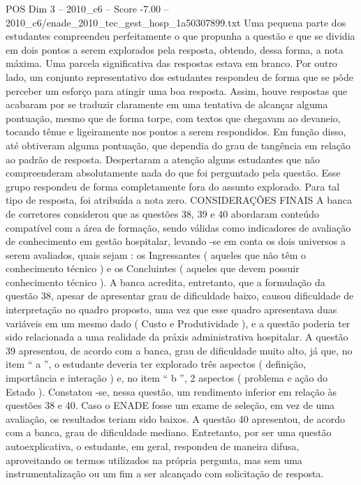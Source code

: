 \begin{textsample}{POS Dim 3 – 2010\_c6 – Score -7.00 – 2010\_c6/enade\_2010\_tec\_gest\_hosp\_1a50307899.txt}
Uma pequena parte dos estudantes compreendeu perfeitamente o que propunha a questão e que se dividia em dois pontos a serem explorados pela resposta, obtendo, dessa forma, a nota máxima.
Uma parcela significativa das respostas estava em branco.
Por outro lado, um conjunto representativo dos estudantes respondeu de forma que se pôde perceber um esforço para atingir uma boa resposta.
Assim, houve respostas que acabaram por se traduzir claramente em uma tentativa de alcançar alguma pontuação, mesmo que de forma torpe, com textos que chegavam ao devaneio, tocando tênue e ligeiramente nos pontos a serem respondidos.
Em função disso, até obtiveram alguma pontuação, que dependia do grau de tangência em relação ao padrão de resposta.
Despertaram a atenção alguns estudantes que não compreenderam absolutamente nada do que foi perguntado pela questão.
Esse grupo respondeu de forma completamente fora do assunto explorado.
Para tal tipo de resposta, foi atribuída a nota zero.
CONSIDERAÇÕES FINAIS A banca de corretores considerou que as questões 38, 39 e 40 abordaram conteúdo compatível com a área de formação, sendo válidas como indicadores de avaliação de conhecimento em gestão hospitalar, levando -se em conta os dois universos a serem avaliados, quais sejam : os Ingressantes ( aqueles que não têm o conhecimento técnico ) e os Concluintes ( aqueles que devem possuir conhecimento técnico ).
A banca acredita, entretanto, que a formulação da questão 38, apesar de apresentar grau de dificuldade baixo, causou dificuldade de interpretação no quadro proposto, uma vez que esse quadro apresentava duas variáveis em um mesmo dado ( Custo e Produtividade ), e a questão poderia ter sido relacionada a uma realidade da práxis administrativa hospitalar.
A questão 39 apresentou, de acordo com a banca, grau de dificuldade muito alto, já que, no item “ a ”, o estudante deveria ter explorado três aspectos ( definição, importância e interação ) e, no item “ b ”, 2 aspectos ( problema e ação do Estado ).
Constatou -se, nessa questão, um rendimento inferior em relação às questões 38 e 40.
Caso o ENADE fosse um exame de seleção, em vez de uma avaliação, os resultados teriam sido baixos.
A questão 40 apresentou, de acordo com a banca, grau de dificuldade mediano.
Entretanto, por ser uma questão autoexplicativa, o estudante, em geral, respondeu de maneira difusa, aproveitando os termos utilizados na própria pergunta, mas sem uma instrumentalização ou um fim a ser alcançado com solicitação de resposta.

\end{textsample}
